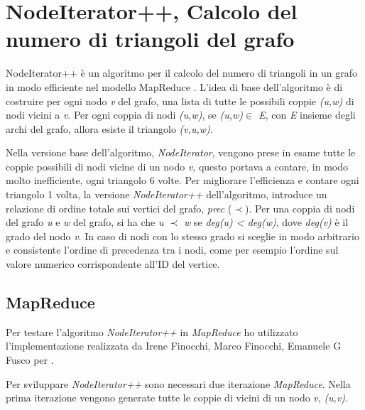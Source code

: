 \documentclass[LaM,binding=0.6cm]{sapthesis}
\begin{document}
\section{NodeIterator++, Calcolo del numero di triangoli del grafo}

NodeIterator++ \cite{Suri:2011:CTC:1963405.1963491} è un algoritmo per il calcolo del numero di triangoli in un grafo in modo efficiente nel modello MapReduce \cite{Dean:2008:MSD:1327452.1327492}.
L'idea di base dell'algoritmo è di costruire per ogni nodo \textit{v} del grafo, una lista di tutte le possibili coppie \textit{(u,w)} di nodi vicini a \textit{v}. Per ogni coppia di nodi \textit{(u,w)}, se \textit{(u,w)$\in$ E}, con \textit{E} insieme degli archi del grafo, allora esiste il triangolo \textit{(v,u,w)}.
 
Nella versione base dell'algoritmo, \textit{NodeIterator}, vengono prese in esame tutte le coppie possibili di nodi vicine di un nodo \textit{v}, questo portava a contare, in modo molto inefficiente, ogni triangolo 6 volte. 
Per migliorare l'efficienza e contare ogni triangolo 1 volta, la versione \textit{NodeIterator++} dell'algoritmo, introduce un relazione di ordine totale sui vertici del grafo, \textit{prec} ($\prec$). Per una coppia di nodi del grafo \textit{u} e \textit{w} del grafo, si ha che \textit{u $\prec$ w} se \textit{deg(u) < deg(w)}, dove \textit{deg(v)} è il grado del nodo \textit{v}. In caso di nodi con lo stesso grado si sceglie in modo arbitrario e consistente l'ordine di precedenza tra i nodi, come per esempio l'ordine sul valore numerico corrispondente all'ID del vertice.

\begin{minipage}{\linewidth}
	
\end{minipage}


\subsection{MapReduce}

Per testare l'algoritmo \textit{NodeIterator++} in \textit{MapReduce} ho utilizzato l'implementazione realizzata da Irene Finocchi, Marco Finocchi, Emanuele G Fusco per  \cite{DBLP:journals/corr/FinocchiFF14}.

Per sviluppare \textit{NodeIterator++ } sono necessari due iterazione \textit{MapReduce}. Nella prima iterazione vengono generate tutte le coppie di vicini di un nodo \textit{v}, \textit{(u,v)}.
\end{document}
